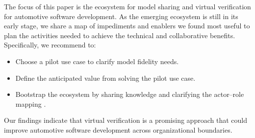 The focus of this paper is 
the ecosystem for model sharing and virtual verification {for automotive software development}.
As the emerging ecosystem is still in its early stage,
we share a map of impediments and enablers we found most useful to plan the activities needed to achieve the technical and collaborative benefits.
Specifically, we recommend to:
\begin{itemize}
    \item Choose a pilot use case to clarify model fidelity needs.
    \item Define the anticipated value from solving the pilot use case.
    \item Bootstrap the ecosystem by sharing knowledge and clarifying the actor--role mapping \cite{kilamo2012proprietary} .
\end{itemize}

Our findings indicate that virtual verification is a promising approach that could improve automotive software development across organizational boundaries.






